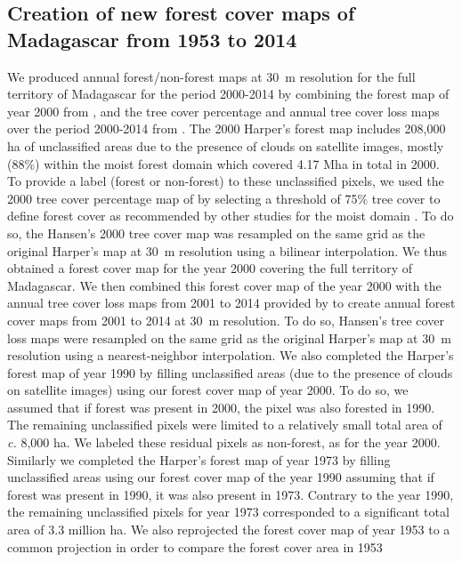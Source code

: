 \documentclass[a4paper, 12pt, leqno]{article}\usepackage[]{graphicx}\usepackage[]{color}
\begin{document}
\subsection{Creation of new forest cover maps of Madagascar from
1953 to 2014}

We produced annual forest/non-forest maps at 30~m resolution for the
full territory of Madagascar for the period 2000-2014 by combining the
forest map of year 2000 from \citet{Harper2007}, and the tree cover
percentage and annual tree cover loss maps over the period 2000-2014
from \citet{Hansen2013}. The 2000 Harper's forest map includes 208,000
ha of unclassified areas due to the presence of clouds on satellite
images, mostly (88\%) within the moist forest domain which covered
4.17 Mha in total in 2000. To provide a label (forest or non-forest)
to these unclassified pixels, we used the 2000 tree cover percentage
map of \citet{Hansen2013} by selecting a threshold of 75\% tree cover
to define forest cover as recommended by other studies for the moist
domain \citep{Achard2014, Aleman2017}. To do so, the Hansen's 2000
tree cover map was resampled on the same grid as the original Harper's
map at 30~m resolution using a bilinear interpolation. We thus
obtained a forest cover map for the year 2000 covering the full
territory of Madagascar. We then combined this forest cover map of the
year 2000 with the annual tree cover loss maps from 2001 to 2014
provided by \citet{Hansen2013} to create annual forest cover maps from
2001 to 2014 at 30~m resolution. To do so, Hansen's tree cover loss
maps were resampled on the same grid as the original Harper's map at
30~m resolution using a nearest-neighbor interpolation. We also
completed the Harper's forest map of year 1990 by filling unclassified
areas (due to the presence of clouds on satellite images) using our
forest cover map of year 2000. To do so, we assumed that if forest was
present in 2000, the pixel was also forested in 1990. The remaining
unclassified pixels were limited to a relatively small total area of
\emph{c.} 8,000 ha. We labeled these residual pixels as non-forest, as
for the year 2000. Similarly we completed the Harper's forest map of
year 1973 by filling unclassified areas using our forest cover map of
the year 1990 assuming that if forest was present in 1990, it was also
present in 1973. Contrary to the year 1990, the remaining unclassified
pixels for year 1973 corresponded to a significant total area of 3.3
million ha. We also reprojected the forest cover map of year 1953 to a
common projection in order to compare the forest cover area in 1953
\end{document}
